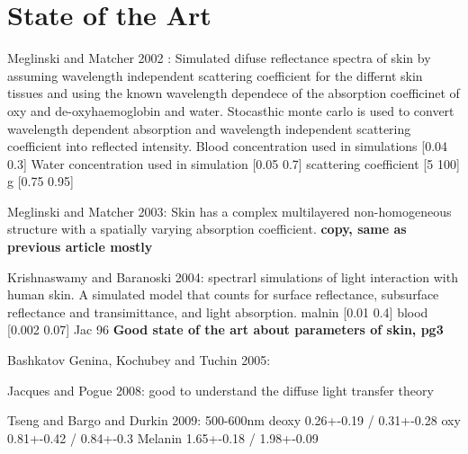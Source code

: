 \chapter{State of the Art}

Meglinski and Matcher 2002 : 
Simulated difuse reflectance spectra of skin by assuming wavelength independent scattering coefficient for the differnt skin tissues and using the known wavelength dependece of the absorption coefficinet of oxy and de-oxyhaemoglobin and water. 
Stocasthic monte carlo is used to convert wavelength dependent absorption and wavelength independent scattering coefficient into reflected intensity.
Blood concentration used in simulations [0.04 0.3]
Water concentration used in simulation [0.05 0.7]
scattering coefficient [5 100]
g [0.75 0.95]

Meglinski and Matcher 2003: 
Skin has a complex multilayered non-homogeneous structure with a spatially varying absorption coefficient. \textbf{copy, same as previous article mostly}

Krishnaswamy and Baranoski 2004: 
spectrarl simulations of light interaction with human skin.
A simulated model that counts for surface reflectance, subsurface reflectance and transimittance, and light absorption.
malnin [0.01 0.4]
blood [0.002 0.07] Jac 96
\textbf{Good state of the art about parameters of skin, pg3}

Bashkatov Genina, Kochubey and Tuchin 2005:

Jacques and Pogue 2008: 
good to understand the diffuse light transfer theory 

Tseng and Bargo and Durkin 2009:
500-600nm
deoxy 0.26+-0.19 / 0.31+-0.28 
oxy   0.81+-0.42 / 0.84+-0.3
Melanin 1.65+-0.18 / 1.98+-0.09

